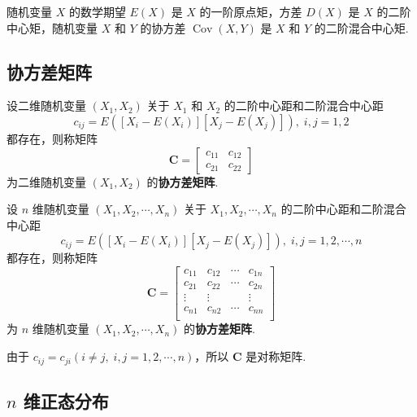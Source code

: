 随机变量 $X$ 的数学期望 $E(X)$ 是 $X$ 的一阶原点矩，方差 $D(X)$ 是 $X$ 的二阶中心矩，随机变量 $X$ 和 $Y$ 的协方差 $\operatorname{Cov}(X,Y)$ 是 $X$ 和 $Y$ 的二阶混合中心矩.

\subsection{协方差矩阵}

\begin{definition}
    设二维随机变量 $(X_1,X_2)$ 关于 $X_1$ 和 $X_2$ 的二阶中心距和二阶混合中心距
    $$
    c_{ij} = E([X_i-E(X_i)][X_j-E(X_j)]), \; i,j=1,2
    $$
    都存在，则称矩阵
    $$
    \boldsymbol{C} = \begin{bmatrix}
        c_{11} & c_{12} \\
        c_{21} & c_{22}
    \end{bmatrix}
    $$
    为二维随机变量 $(X_1,X_2)$ 的\textbf{协方差矩阵}.

    设 $n$ 维随机变量 $(X_1,X_2,\cdots,X_n)$ 关于 $X_1,X_2,\cdots,X_n$ 的二阶中心距和二阶混合中心距
    $$
    c_{ij} = E([X_i-E(X_i)][X_j-E(X_j)]), \; i,j=1,2,\cdots,n
    $$
    都存在，则称矩阵
    $$
    \boldsymbol{C} = \begin{bmatrix}
        c_{11} & c_{12} & \cdots & c_{1n} \\
        c_{21} & c_{22} & \cdots & c_{2n} \\
        \vdots & \vdots & & \vdots \\
        c_{n1} & c_{n2} & \cdots & c_{nn} \\
    \end{bmatrix}
    $$
    为 $n$ 维随机变量 $(X_1,X_2,\cdots,X_n)$ 的\textbf{协方差矩阵}.
\end{definition}

由于 $c_{ij}=c_{ji} (i \not= j, \; i,j=1,2,\cdots,n)$，所以 $\boldsymbol{C}$ 是对称矩阵.

\subsection{$n$ 维正态分布}

